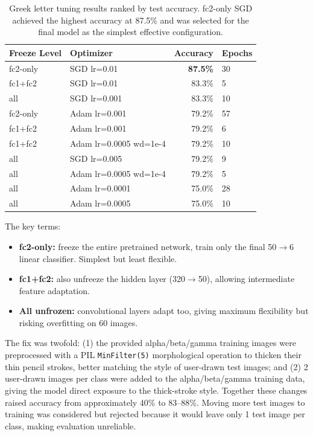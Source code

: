 \documentclass[11pt]{article}
\begin{document}
\begin{table}[H]
    \centering
    \begin{tabular}{llrl}
        \toprule
        Freeze Level & Optimizer & Accuracy & Epochs \\
        \midrule
        fc2-only  & SGD lr=0.01           & \textbf{87.5\%} & 30 \\
        fc1+fc2   & SGD lr=0.01           & 83.3\% & 5 \\
        all       & SGD lr=0.001          & 83.3\% & 10 \\
        fc2-only  & Adam lr=0.001         & 79.2\% & 57 \\
        fc1+fc2   & Adam lr=0.001         & 79.2\% & 6 \\
        fc1+fc2   & Adam lr=0.0005 wd=1e-4 & 79.2\% & 10 \\
        all       & SGD lr=0.005          & 79.2\% & 9 \\
        all       & Adam lr=0.0005 wd=1e-4 & 79.2\% & 5 \\
        all       & Adam lr=0.0001        & 75.0\% & 28 \\
        all       & Adam lr=0.0005        & 75.0\% & 10 \\
        \bottomrule
    \end{tabular}
    \caption{Greek letter tuning results ranked by test accuracy.
    fc2-only SGD achieved the highest accuracy at 87.5\% and was
    selected for the final model as the simplest effective configuration.}
    \label{tab:tuner}
\end{table}

The key terms:
\begin{itemize}
    \item \textbf{fc2-only:} freeze the entire pretrained network,
    train only the final 50$\to$6 linear classifier. Simplest but
    least flexible.
    \item \textbf{fc1+fc2:} also unfreeze the hidden layer
    (320$\to$50), allowing intermediate feature adaptation.
    \item \textbf{All unfrozen:} convolutional layers adapt too,
    giving maximum flexibility but risking overfitting on 60 images.
\end{itemize}

The fix was twofold: (1) the provided alpha/beta/gamma training images
were preprocessed with a PIL \texttt{MinFilter(5)} morphological
operation to thicken their thin pencil strokes, better matching the
style of user-drawn test images; and (2) 2 user-drawn images per class
were added to the alpha/beta/gamma training data, giving the model
direct exposure to the thick-stroke style. Together these changes raised
accuracy from approximately 40\% to 83--88\%. Moving more test images to training was considered but
rejected because it would leave only 1 test image per class,
making evaluation unreliable.
\end{document}
